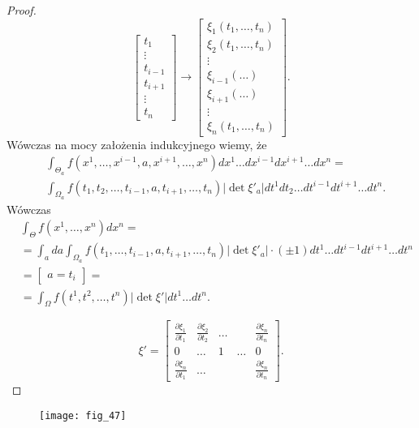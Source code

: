 \documentclass[../main.tex]{subfiles}
\begin{document}
\begin{proof}
     \[
         \begin{bmatrix} t_1\\ \vdots\\ t_{i-1}\\ t_{i+1} \\ \vdots \\ t_n \end{bmatrix} \to \begin{bmatrix} \xi_1(t_1,\ldots,t_n) \\ \xi_2(t_1,\ldots,t_n) \\ \vdots \\ \xi_{i-1}(\ldots) \\ \xi_{i+1}(\ldots) \\ \vdots \\ \xi_n(t_1,\ldots,t_n)\end{bmatrix}
    .\]
    Wówczas na mocy założenia indukcyjnego wiemy, że
    \begin{align*}
        &\int_{\Theta_a}f(x^1,\ldots,x^{i-1},a,x^{i+1},\ldots,x^n) dx^1 \ldots dx^{i-1} dx^{i+1} \ldots dx^n = \\
        &\int_{\Omega_a} f(t_1,t_2,\ldots,t_{i-1},a,t_{i+1},\ldots,t_n) |\det \xi'_a | dt^1 dt_2 \ldots dt^{i-1} dt^{i+1} \ldots dt^n
    .\end{align*}
    Wówczas
    \begin{align*}
        &\int_{\Theta}f(x^1,\ldots,x^n)dx^n =\\
        &=\int_a da \int_{\Omega_a}f(t_1,\ldots,t_{i-1},a,t_{i+1},\ldots,t_n) |\det \xi'_a| \cdot (\pm 1) dt^1 \ldots dt^{i-1} dt^{i+1} \ldots dt^n\\
        &= \begin{bmatrix} a=t_i \end{bmatrix} =\\
        &= \int_{\Omega} f(t^1,t^2,\ldots,t^n)|\det \xi' | dt^1 \ldots dt^n
.\end{align*}

\[
    \xi' = \begin{bmatrix} \frac{\partial \xi_1}{\partial t_1} & \frac{\partial \xi_2}{\partial t_2} & \ldots && \frac{\partial \xi_n}{\partial t_n}\\ 0 & \ldots & 1 & \ldots & 0 \\ \frac{\partial \xi_n}{\partial t_1} & \ldots &&& \frac{\partial \xi_n}{\partial t_n}  \end{bmatrix}
.\]

    \end{proof}
    \begin{figure}[h]
        \centering
        \texttt{[image: fig\_47]}
    \end{figure}
\end{document}
